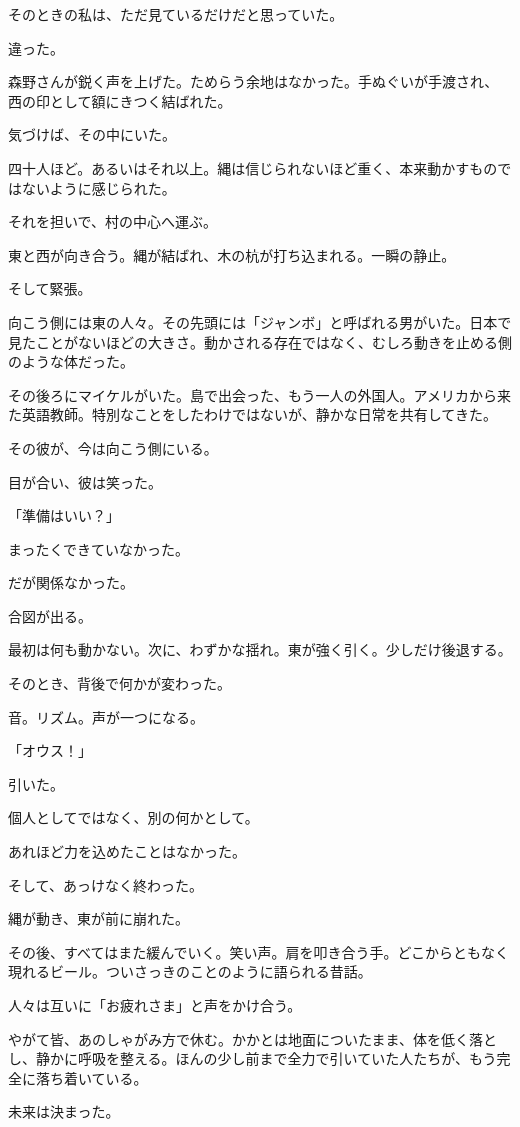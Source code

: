 \documentclass[
  letterpaper,
  oneside]{scrbook}
\begin{document}
そのときの私は、ただ見ているだけだと思っていた。

違った。

森野さんが鋭く声を上げた。ためらう余地はなかった。手ぬぐいが手渡され、西の印として額にきつく結ばれた。

気づけば、その中にいた。

四十人ほど。あるいはそれ以上。縄は信じられないほど重く、本来動かすものではないように感じられた。

それを担いで、村の中心へ運ぶ。

東と西が向き合う。縄が結ばれ、木の杭が打ち込まれる。一瞬の静止。

そして緊張。

向こう側には東の人々。その先頭には「ジャンボ」と呼ばれる男がいた。日本で見たことがないほどの大きさ。動かされる存在ではなく、むしろ動きを止める側のような体だった。

その後ろにマイケルがいた。島で出会った、もう一人の外国人。アメリカから来た英語教師。特別なことをしたわけではないが、静かな日常を共有してきた。

その彼が、今は向こう側にいる。

目が合い、彼は笑った。

「準備はいい？」

まったくできていなかった。

だが関係なかった。

合図が出る。

最初は何も動かない。次に、わずかな揺れ。東が強く引く。少しだけ後退する。

そのとき、背後で何かが変わった。

音。リズム。声が一つになる。

「オウス！」

引いた。

個人としてではなく、別の何かとして。

あれほど力を込めたことはなかった。

そして、あっけなく終わった。

縄が動き、東が前に崩れた。

その後、すべてはまた緩んでいく。笑い声。肩を叩き合う手。どこからともなく現れるビール。ついさっきのことのように語られる昔話。

人々は互いに「お疲れさま」と声をかけ合う。

やがて皆、あのしゃがみ方で休む。かかとは地面についたまま、体を低く落とし、静かに呼吸を整える。ほんの少し前まで全力で引いていた人たちが、もう完全に落ち着いている。

未来は決まった。
\end{document}
